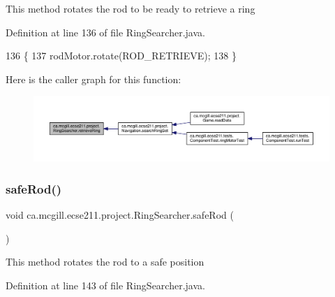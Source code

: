 This method rotates the rod to be ready to retrieve a ring 

Definition at line 136 of file Ring\+Searcher.\+java.


\begin{DoxyCode}
136                              \{
137     rodMotor.rotate(ROD\_RETRIEVE);
138   \}
\end{DoxyCode}
Here is the caller graph for this function\+:\nopagebreak
\begin{figure}[H]
\begin{center}
\leavevmode
\includegraphics[width=350pt]{classca_1_1mcgill_1_1ecse211_1_1project_1_1_ring_searcher_afca3a0c746b07abb88881d926f4fe71f_icgraph}
\end{center}
\end{figure}
\mbox{\label{classca_1_1mcgill_1_1ecse211_1_1project_1_1_ring_searcher_a0b96c45f7df3eb557496acab33930cd5}} 
\subsubsection{\texorpdfstring{safe\+Rod()}{safeRod()}}
{\footnotesize\ttfamily void ca.\+mcgill.\+ecse211.\+project.\+Ring\+Searcher.\+safe\+Rod (\begin{DoxyParamCaption}{ }\end{DoxyParamCaption})}

This method rotates the rod to a safe position 

Definition at line 143 of file Ring\+Searcher.\+java.


